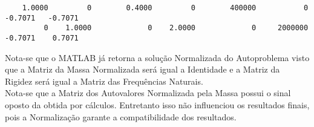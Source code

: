 \documentclass{article}
\begin{document}
\begin{resolution}
\begin{scriptsize}
\begin{lstlisting}
    1.0000         0        0.4000         0        400000           0          -0.7071   -0.7071
         0    1.0000             0    2.0000             0     2000000          -0.7071    0.7071
    \end{lstlisting}
    \end{scriptsize}
    Nota-se que o MATLAB já retorna a solução Normalizada do Autoproblema visto que a Matriz da Massa Normalizada será igual a Identidade e a Matriz da Rigidez será igual a Matriz das Frequências Naturais.\\

    Nota-se que a Matriz dos Autovalores Normalizada pela Massa possui o sinal oposto da obtida por cálculos. Entretanto isso não influenciou os resultados finais, pois a Normalização garante a compatibilidade dos resultados.
\end{resolution}
\end{document}
